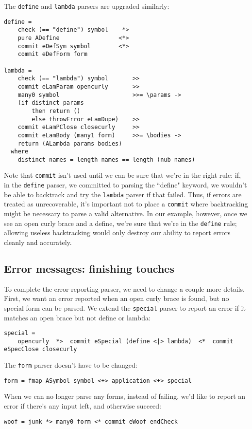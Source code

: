 \documentclass{tmr}
\begin{document}
The \verb+define+ and \verb+lambda+ parsers are upgraded similarly:
\begin{verbatim}
define =
    check (== "define") symbol    *>
    pure ADefine                 <*>
    commit eDefSym symbol        <*>
    commit eDefForm form
    
lambda =
    check (== "lambda") symbol       >>
    commit eLamParam opencurly       >>
    many0 symbol                     >>= \params ->
    (if distinct params 
        then return ()
        else throwError eLamDupe)    >>
    commit eLamPClose closecurly     >>
    commit eLamBody (many1 form)     >>= \bodies ->
    return (ALambda params bodies)
  where
    distinct names = length names == length (nub names)
\end{verbatim}

Note that \verb+commit+ isn't used until we can be sure that we're in the right 
rule: if, in the \verb+define+ parser, we committed to parsing the ``define" 
keyword, we wouldn't be able to backtrack and try the \verb+lambda+ parser if 
that failed.  Thus, if errors are treated as unrecoverable, it's important not to 
place a \verb+commit+ where backtracking might be necessary to parse a valid 
alternative.  In our example, however, once 
we see an open curly brace and a define, we're sure that we're in the \verb+define+
rule; allowing useless backtracking would only destroy our ability to report 
errors cleanly and accurately.

\subsection{Error messages:  finishing touches}
To complete the error-reporting parser, we need to change a couple more details. 
First, we want an error reported when an open curly brace is found, but no 
special form can be parsed.  We extend the \verb+special+ 
parser to report an error if it matches an open brace but not define or lambda:
\begin{verbatim}
special = 
    opencurly  *>  commit eSpecial (define <|> lambda)  <*  commit eSpecClose closecurly
\end{verbatim}

The \verb+form+ parser doesn't have to be changed:
\begin{verbatim}
form = fmap ASymbol symbol <+> application <+> special
\end{verbatim}

When we can no longer parse any forms, instead of failing, we'd like to report 
an error if there's any input left, and otherwise succeed:
\begin{verbatim}
woof = junk *> many0 form <* commit eWoof endCheck
\end{verbatim}
\end{document}
